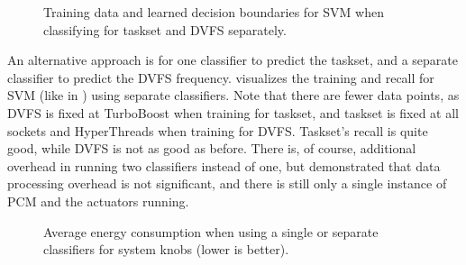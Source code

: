 \begin{figure}[t]
  \centering
  \hspace*{0.1cm}
\caption{Training data and learned decision boundaries for SVM when classifying for taskset and DVFS separately.}
\label{fig:feat-space-svm-separate}
\end{figure}

An alternative approach is for one classifier to predict the taskset, and a separate classifier to predict the DVFS frequency.
 visualizes the training and recall for SVM (like  in ) using separate classifiers.
Note that there are fewer data points, as DVFS is fixed at TurboBoost when training for taskset, and taskset is fixed at all sockets and HyperThreads when training for DVFS.
Taskset's recall is quite good, while DVFS is not as good as before.
There is, of course, additional overhead in running two classifiers instead of one, but  demonstrated that data processing overhead is not significant, and there is still only a single instance of PCM and the actuators running.

\begin{figure}[t]
  \centering
  
  \caption{Average energy consumption when using a single or separate classifiers for system knobs (lower is better).}
  \label{fig:separate-clfs}
\end{figure}

